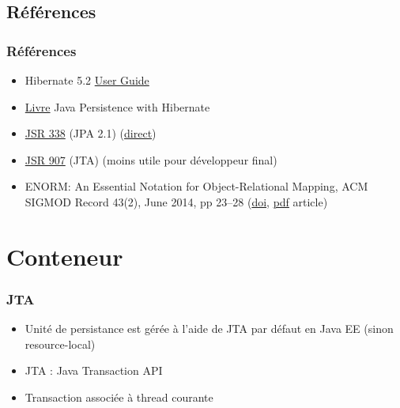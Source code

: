\documentclass[english, french]{beamer}
\begin{document}

\subsection{Références}
\begin{frame}
	\frametitle{Références}
	\begin{itemize}
		\item Hibernate 5.2 \href{http://docs.jboss.org/hibernate/orm/5.2/userguide/html_single/Hibernate_User_Guide.html}{User Guide}
		\item \href{http://gen.lib.rus.ec/book/index.php?md5=637EF62E37571955C70D1EF40114341A}{Livre} Java Persistence with Hibernate
		\item \href{https://jcp.org/en/jsr/detail?id=338}{JSR 338} (JPA 2.1) (\href{http://download.oracle.com/otn-pub/jcp/persistence-2_1-fr-eval-spec/JavaPersistence.pdf}{direct})
		\item \href{https://jcp.org/en/jsr/detail?id=907}{JSR 907} (JTA) (moins utile pour développeur final)
		\item ENORM: An Essential Notation for Object-Relational Mapping, ACM SIGMOD Record 43(2), June 2014, pp 23–28 (\href{http://dx.doi.org/10.1145/2694413.2694418}{doi}, \href{http://www.sigmod.org/publications/sigmod-record/1406/pdfs/05.articles.Torres.pdf}{pdf} article)
	\end{itemize}
\end{frame}


\appendix

\section{Conteneur}
\begin{frame}
	\frametitle{JTA}
	\begin{itemize}
		\item Unité de persistance est gérée à l’aide de JTA {\tiny par défaut en Java EE (sinon \og{}resource-local\fg{})}
		\item JTA : Java Transaction API
		\item Transaction associée à thread courante
	\end{itemize}
\end{frame}
\end{document}
